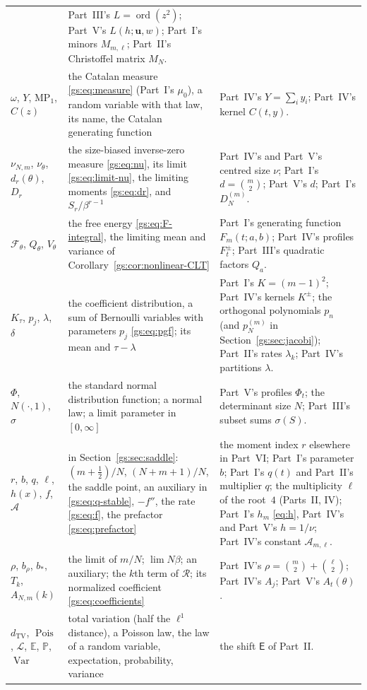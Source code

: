 \documentclass[11pt,a4paper]{article}
\numberwithin{equation}{section}
\theoremstyle{definition}
\theoremstyle{remark}
\newcommand{\ord}{\operatorname{ord}}
\newcommand{\E}{\mathsf E}
\newcommand{\bu}{\boldsymbol u}
\newcommand{\Rgs}{\mathcal R}
\newcommand{\Egs}{\mathbb E}
\newcommand{\PP}{\mathbb P}
\newcommand{\Pois}{\operatorname{Pois}}
\newcommand{\Var}{\operatorname{Var}}
\newcommand{\TV}{d_{\mathrm{TV}}}
\newcommand{\MP}{\mathrm{MP}_1}
\newcommand{\Law}{\mathcal L}
\newcommand{\calF}{\mathcal F}
\begin{document}
\begin{longtable}{@{}>{\raggedright}p{}>{\raggedright}p{}>{\raggedright\arraybackslash}p{}@{}}
 & Part~III's $L=\ord(z^2)$; Part~V's $L(h;\bu,w)$; Part~I's minors
   $M_{m,\ell}$; Part~II's Christoffel matrix $M_N$.\\
$\omega$, $Y$, $\MP$, $C(z)$
 & the Catalan measure \eqref{gs:eq:measure} (Part~I's $\mu_0$), a
   random variable with that law, its name, the Catalan generating function
 & Part~IV's $Y=\sum_iy_i$; Part~IV's kernel $C(t,y)$.\\
$\nu_{N,m}$, $\nu_\theta$, $d_r(\theta)$, $D_r$
 & the size-biased inverse-zero measure \eqref{gs:eq:nu}, its limit
   \eqref{gs:eq:limit-nu}, the limiting moments \eqref{gs:eq:dr}, and
   $S_r/\beta^{r-1}$
 & Part~IV's and Part~V's centred size $\nu$; Part~I's $d=\binom m2$;
   Part~V's $d$; Part~I's $D_N^{(m)}$.\\
$\calF_\theta$, $Q_\theta$, $V_\theta$
 & the free energy \eqref{gs:eq:F-integral}, the limiting mean and variance
   of Corollary~\ref{gs:cor:nonlinear-CLT}
 & Part~I's generating function $F_m(t;a,b)$; Part~IV's profiles
   $F_t^\pm$; Part~III's quadratic factors $Q_a$.\\
$K_\tau$, $p_j$, $\lambda$, $\delta$
 & the coefficient distribution, a sum of Bernoulli variables with
   parameters $p_j$ \eqref{gs:eq:pgf}; its mean and $\tau-\lambda$
 & Part~I's $K=(m-1)^2$; Part~IV's kernels $K^\pm$; the orthogonal
   polynomials $p_n$ (and $p_N^{(m)}$ in Section~\ref{gs:sec:jacobi});
   Part~II's rates $\lambda_k$; Part~IV's partitions $\lambda$.\\
$\Phi$, $N(\cdot,1)$, $\sigma$
 & the standard normal distribution function; a normal law; a limit
   parameter in $[0,\infty]$
 & Part~V's profiles $\Phi_t$; the determinant size $N$; Part~III's
   subset sums $\sigma(S)$.\\
$r$, $b$, $q$, $\ell$, $h(x)$, $f$, $\mathcal A$
 & in Section~\ref{gs:sec:saddle}: $(m+\frac12)/N$, $(N+m+1)/N$, the
   saddle point, an auxiliary in \eqref{gs:eq:q-stable}, $-f''$, the rate
   \eqref{gs:eq:f}, the prefactor \eqref{gs:eq:prefactor}
 & the moment index $r$ elsewhere in Part~VI; Part~I's parameter $b$;
   Part~I's $q(t)$ and Part~II's multiplier $q$; the multiplicity $\ell$ of
   the root~$4$ (Parts~II, IV); Part~I's $h_m$ \eqref{eq:h}, Part~IV's and
   Part~V's $h=1/\nu$; Part~IV's constant $\mathcal A_{m,\ell}$.\\
$\rho$, $b_\rho$, $b_*$, $T_k$, $A_{N,m}(k)$
 & the limit of $m/N$; $\lim N\beta$; an auxiliary; the $k$th term of
   $\Rgs$; its normalized coefficient \eqref{gs:eq:coefficients}
 & Part~IV's $\rho=\binom m2+\binom\ell2$; Part~IV's $A_j$; Part~V's
   $A_t(\theta)$.\\
$\TV$, $\Pois$, $\Law$, $\Egs$, $\PP$, $\Var$
 & total variation (half the $\ell^1$ distance), a Poisson law, the law of
   a random variable, expectation, probability, variance
 & the shift $\E$ of Part~II.\\
\end{longtable}
\endgroup
\end{document}
